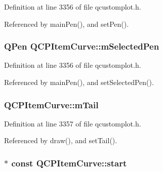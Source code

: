 Definition at line 3356 of file qcustomplot.\+h.



Referenced by main\+Pen(), and set\+Pen().

\hypertarget{class_q_c_p_item_curve_ab22cbab261b20be5aa8e4ca252149246}{}
\subsubsection[{m\+Selected\+Pen}]{\setlength{\rightskip}{0pt plus 5cm}Q\+Pen Q\+C\+P\+Item\+Curve\+::m\+Selected\+Pen\hspace{0.3cm}{\ttfamily [protected]}}\label{class_q_c_p_item_curve_ab22cbab261b20be5aa8e4ca252149246}


Definition at line 3356 of file qcustomplot.\+h.



Referenced by main\+Pen(), and set\+Selected\+Pen().

\hypertarget{class_q_c_p_item_curve_af1dca285b97e3f5b892dab827a79f327}{}
\subsubsection[{m\+Tail}]{ Q\+C\+P\+Item\+Curve\+::m\+Tail\hspace{0.3cm}{\ttfamily [protected]}}\label{class_q_c_p_item_curve_af1dca285b97e3f5b892dab827a79f327}


Definition at line 3357 of file qcustomplot.\+h.



Referenced by draw(), and set\+Tail().

\hypertarget{class_q_c_p_item_curve_a20c3b5ea31c33764f4f30c2ec7ae518b}{}
\subsubsection[{start}]{$\ast$ const Q\+C\+P\+Item\+Curve\+::start}\label{class_q_c_p_item_curve_a20c3b5ea31c33764f4f30c2ec7ae518b}


